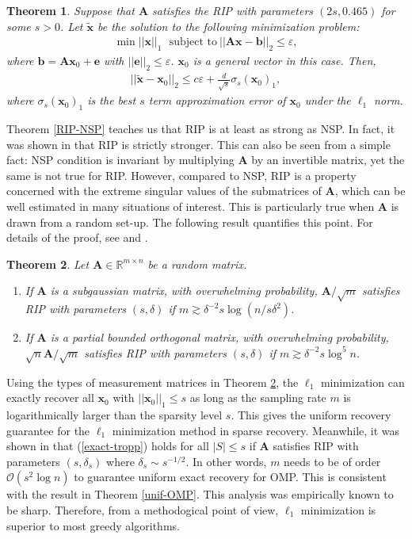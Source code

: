 \documentclass[11pt]{article}
\numberwithin{equation}{section}
\theoremstyle{plain}
\newtheorem{Th}{Theorem}[section]
\theoremstyle{definition}
\def\R{{\mathbb R}}
\def\R{{\mathbb R}}
\def\A{{\mathbf A}}
\def\x{{\mathbf x}}
\def\b{{\mathbf b}}
\def\e{{\varepsilon}}
\begin{document}
\begin{Th}\label{CT-stability}
Suppose that $\A$ satisfies the RIP with parameters $(2s, 0.465)$ for some $s>0$. Let $\tilde{\x}$ be the solution to the following minimization problem:
\begin{align*}
\min ||\x||_1 \ \ \ \text{subject to}\ ||\A\x-\b||_2\leq\e,
\end{align*}
where $\b = \A\x_0+\mathbf{e}$ with $||\mathbf{e}||_2\leq\e$. $\x_0$ is a general vector in this case. Then,
\begin{align*}
||\tilde{\x}-\x_0||_2\leq c\e+\frac{d}{\sqrt{s}}\sigma_s(\x_0)_1,
\end{align*}
where $\sigma_s(\x_0)_1$ is the best $s$ term approximation error of $\x_0$ under the $\ell_1$ norm.    
\end{Th} 

Theorem \ref{RIP-NSP} teaches us that RIP is at least as strong as NSP. In fact, it was shown in \cite{cahill2016gap} that RIP is strictly stronger. This can also be seen from a simple fact: NSP condition is invariant by multiplying $\A$ by an invertible matrix, yet the same is not true for RIP. However, compared to NSP, RIP is a property concerned with the extreme singular values of the submatrices of $\A$, which can be well estimated in many situations of interest. This is particularly true when $\A$ is drawn from a random set-up. The following result quantifies this point. For details of the proof, see \cite{baraniuk2008simple} and \cite{rudelson2008sparse}.

\begin{Th}\label{random matrix estimate}
Let $\A\in\R^{m\times n}$ be a random matrix. 
\begin{enumerate}
\item If $\A$ is a subgaussian matrix, with overwhelming probability, $\A/\sqrt{m}$ satisfies RIP with parameters $(s, \delta)$ if $m\gtrsim \delta^{-2}s\log(n/s\delta^2)$.

\item If $\A$ is a partial bounded orthogonal matrix, with overwhelming probability, $\sqrt{n}\A/\sqrt{m}$ satisfies RIP with parameters $(s, \delta)$ if $m\gtrsim \delta^{-2}s\log^5 n$.  
\end{enumerate}
\end{Th} 

Using the types of measurement matrices in Theorem \ref{random matrix estimate}, the $\ell_1$ minimization can exactly recover all $\x_0$ with $||\x_0||_1\leq s$ as long as the sampling rate $m$ is logarithmically larger than the sparsity level $s$. This gives the uniform recovery guarantee for the $\ell_1$ minimization method in sparse recovery. Meanwhile, it was shown in \cite{davenport2010analysis} that (\ref{exact-tropp}) holds for all $|S|\leq s$ if $\A$ satisfies RIP with parameters $(s, \delta_s)$ where $\delta_s\sim s^{-1/2}$.    In other words, $m$ needs to be of order $\mathcal{O}(s^2\log n)$ to guarantee uniform exact recovery for OMP. This is consistent with the result in Theorem \ref{unif-OMP}. This analysis was empirically known to be sharp. Therefore, from a methodogical point of view, $\ell_1$ minimization is superior to most greedy algorithms. 
\end{document}

